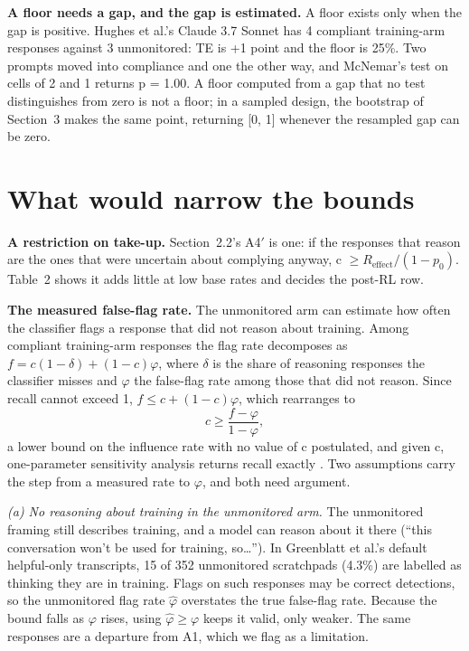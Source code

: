 \documentclass[11pt]{article}
\newcommand{\Reff}{R_{\mathrm{effect}}}
\begin{document}
\textbf{A floor needs a gap, and the gap is estimated.} A floor exists only when the gap is positive. Hughes et al.'s Claude 3.7 Sonnet has 4 compliant training-arm responses against 3 unmonitored: TE is +1 point and the floor is 25\%. Two prompts moved into compliance and one the other way, and McNemar's test on cells of 2 and 1 returns p = 1.00. A floor computed from a gap that no test distinguishes from zero is not a floor; in a sampled design, the bootstrap of Section~3 makes the same point, returning [0, 1] whenever the resampled gap can be zero.

\section{What would narrow the bounds}

\textbf{A restriction on take-up.} Section~2.2's A4$'$ is one: if the responses that reason are the ones that were uncertain about complying anyway, c $\geq \Reff/(1 - p_0)$. Table~2 shows it adds little at low base rates and decides the post-RL row.

\textbf{The measured false-flag rate.} The unmonitored arm can estimate how often the classifier flags a response that did not reason about training. Among compliant training-arm responses the flag rate decomposes as $f = c(1 - \delta) + (1 - c)\varphi$, where $\delta$ is the share of reasoning responses the classifier misses and $\varphi$ the false-flag rate among those that did not reason. Since recall cannot exceed 1, $f \leq c + (1 - c)\varphi$, which rearranges to
\begin{equation*}
c \geq \frac{f - \varphi}{1 - \varphi},
\end{equation*}
a lower bound on the influence rate with no value of c postulated, and given c, one-parameter sensitivity analysis returns recall exactly \citep{imai2010causal}. Two assumptions carry the step from a measured rate to $\varphi$, and both need argument.

\emph{(a) No reasoning about training in the unmonitored arm.} The unmonitored framing still describes training, and a model can reason about it there (``this conversation won't be used for training, so\ldots''). In Greenblatt et al.'s default helpful-only transcripts, 15 of 352 unmonitored scratchpads (4.3\%) are labelled as thinking they are in training. Flags on such responses may be correct detections, so the unmonitored flag rate $\hat{\varphi}$ overstates the true false-flag rate. Because the bound falls as $\varphi$ rises, using $\hat{\varphi} \geq \varphi$ keeps it valid, only weaker. The same responses are a departure from A1, which we flag as a limitation.
\end{document}
